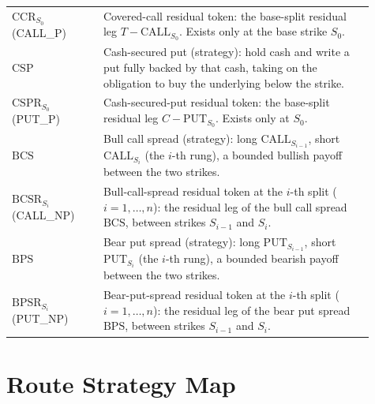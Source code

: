 \documentclass[11pt]{article}
\newcommand{\Call}{\mathrm{CALL}}
\newcommand{\Put}{\mathrm{PUT}}
\newcommand{\CCR}{\mathrm{CCR}_{S_0}}
\newcommand{\CSPR}{\mathrm{CSPR}_{S_0}}
\newcommand{\BCSR}{\mathrm{BCSR}}
\newcommand{\BPSR}{\mathrm{BPSR}}
\begin{document}
\begin{longtable}{>{\raggedright\arraybackslash}p{0.23\linewidth}p{0.68\linewidth}}
$\CCR$ (CALL\_P) & Covered-call residual token: the base-split residual leg $T-\Call_{S_0}$. Exists only at the base strike $S_0$. \\
$\mathrm{CSP}$ & Cash-secured put (strategy): hold cash and write a put fully backed by that cash, taking on the obligation to buy the underlying below the strike. \\
$\CSPR$ (PUT\_P) & Cash-secured-put residual token: the base-split residual leg $C-\Put_{S_0}$. Exists only at $S_0$. \\
$\mathrm{BCS}$ & Bull call spread (strategy): long $\Call_{S_{i-1}}$, short $\Call_{S_i}$ (the $i$-th rung), a bounded bullish payoff between the two strikes. \\
$\BCSR_{S_i}$ (CALL\_NP) & Bull-call-spread residual token at the $i$-th split ($i=1,\dots,n$): the residual leg of the bull call spread $\mathrm{BCS}$, between strikes $S_{i-1}$ and $S_i$. \\
$\mathrm{BPS}$ & Bear put spread (strategy): long $\Put_{S_{i-1}}$, short $\Put_{S_i}$ (the $i$-th rung), a bounded bearish payoff between the two strikes. \\
$\BPSR_{S_i}$ (PUT\_NP) & Bear-put-spread residual token at the $i$-th split ($i=1,\dots,n$): the residual leg of the bear put spread $\mathrm{BPS}$, between strikes $S_{i-1}$ and $S_i$. \\
\bottomrule
\end{longtable}

\clearpage
\section{Route Strategy Map}
\end{document}
